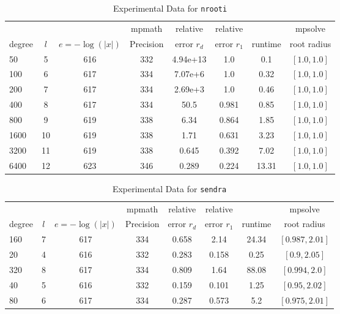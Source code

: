 \documentclass[sigconf]{acmart}
\begin{document}
\begin{table}[t]
\caption{Experimental Data for \texttt{nrooti}} %
\label{tab:nrooti}
\vskip -0.15in
\begin{center}
\begin{small}
\begin{sc}
\begin{tabular}{lccccccc}
\toprule
&  &  & mpmath & relative  & relative &  & mpsolve \\
degree  & $l$& $e=-\log(|x|)$& Precision &error $r_d$       & error $r_1$ &runtime& root radius\\
\midrule
 50 & 5 & 616 & 332 & 4.94e+13 & 1.0 & 0.1 & $[1.0, 1.0]$\\
 100 & 6 & 617 & 334 & 7.07e+6 & 1.0 & 0.32 & $[1.0, 1.0]$\\
  200 & 7 & 617 & 334 & 2.69e+3 & 1.0 & 0.46 & $[1.0, 1.0]$\\
 400 & 8 & 617 & 334 & 50.5 & 0.981 & 0.85 & $[1.0, 1.0]$\\
 800 & 9 & 619 & 338 & 6.34 & 0.864 & 1.85 & $[1.0, 1.0]$\\
 1600 & 10 & 619 & 338 & 1.71 & 0.631 & 3.23 & $[1.0, 1.0]$\\
 3200 & 11 & 619 & 338 & 0.645 & 0.392 & 7.02 & $[1.0, 1.0]$\\
 6400 & 12 & 623 & 346 & 0.289 & 0.224 & 13.31 & $[1.0, 1.0]$\\
\bottomrule
\end{tabular}
\end{sc}
\end{small}
\end{center}
\vskip 0.05in
\end{table}

\begin{table}[t]
\caption{Experimental Data for \texttt{sendra}} %
\label{tab:sendra}
\vskip -0.15in
\begin{center}
\begin{small}
\begin{sc}
\begin{tabular}{lccccccc}
\toprule
&  &  & mpmath & relative  & relative &  & mpsolve \\
degree  & $l$& $e=-\log(|x|)$& Precision &error $r_d$       & error $r_1$ &runtime& root radius\\
\midrule
 160 & 7 & 617 & 334 & 0.658 & 2.14 & 24.34 & $[0.987, 2.01]$\\
 20 & 4 & 616 & 332 & 0.283 & 0.158 & 0.25 & $[0.9, 2.05]$\\
 320 & 8 & 617 & 334 & 0.809 & 1.64 & 88.08 & $[0.994, 2.0]$\\
 40 & 5 & 616 & 332 & 0.159 & 0.101 & 1.25 & $[0.95, 2.02]$\\
 80 & 6 & 617 & 334 & 0.287 & 0.573 & 5.2 & $[0.975, 2.01]$\\
\bottomrule
\end{tabular}
\end{sc}
\end{small}
\end{center}
\vskip 0.05in
\end{table}
\end{document}
